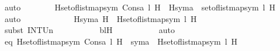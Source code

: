 \begin{isabellebody}
\ auto\isanewline
\isanewline
\ \ \ \ \ \ \isamarkupfalse%
\ {\isachardoublequoteopen}{\isacharparenleft}{\kern0pt}{\isasymInter}H{\isasymin}set{\isacharunderscore}{\kern0pt}of{\isacharunderscore}{\kern0pt}list{\isacharparenleft}{\kern0pt}map{\isacharparenleft}{\kern0pt}sym{\isacharcomma}{\kern0pt}\ Cons{\isacharparenleft}{\kern0pt}a{\isacharcomma}{\kern0pt}\ l{\isacharparenright}{\kern0pt}{\isacharparenright}{\kern0pt}{\isacharparenright}{\kern0pt}{\isachardot}{\kern0pt}\ H{\isacharparenright}{\kern0pt}\ {\isacharequal}{\kern0pt}\ {\isacharparenleft}{\kern0pt}{\isasymInter}H{\isasymin}{\isacharbraceleft}{\kern0pt}sym{\isacharparenleft}{\kern0pt}a{\isacharparenright}{\kern0pt}{\isacharbraceright}{\kern0pt}\ {\isasymunion}\ set{\isacharunderscore}{\kern0pt}of{\isacharunderscore}{\kern0pt}list{\isacharparenleft}{\kern0pt}map{\isacharparenleft}{\kern0pt}sym{\isacharcomma}{\kern0pt}\ l{\isacharparenright}{\kern0pt}{\isacharparenright}{\kern0pt}{\isachardot}{\kern0pt}\ H{\isacharparenright}{\kern0pt}{\isachardoublequoteclose}\ \isamarkupfalse%
\ auto\ \isanewline
\ \ \ \ \ \ \isamarkupfalse%
\ \isamarkupfalse%
\ {\isachardoublequoteopen}{\isachardot}{\kern0pt}{\isachardot}{\kern0pt}{\isachardot}{\kern0pt}\ {\isacharequal}{\kern0pt}\ {\isacharparenleft}{\kern0pt}{\isasymInter}H{\isasymin}{\isacharbraceleft}{\kern0pt}sym{\isacharparenleft}{\kern0pt}a{\isacharparenright}{\kern0pt}{\isacharbraceright}{\kern0pt}{\isachardot}{\kern0pt}\ H{\isacharparenright}{\kern0pt}\ {\isasyminter}\ {\isacharparenleft}{\kern0pt}{\isasymInter}H{\isasymin}set{\isacharunderscore}{\kern0pt}of{\isacharunderscore}{\kern0pt}list{\isacharparenleft}{\kern0pt}map{\isacharparenleft}{\kern0pt}sym{\isacharcomma}{\kern0pt}\ l{\isacharparenright}{\kern0pt}{\isacharparenright}{\kern0pt}{\isachardot}{\kern0pt}\ H{\isacharparenright}{\kern0pt}{\isachardoublequoteclose}\ \isanewline
\ \ \ \ \ \ \ \ \isamarkupfalse%
\ {\isacharparenleft}{\kern0pt}subst\ INT{\isacharunderscore}{\kern0pt}Un{\isacharparenright}{\kern0pt}\ \isanewline
\ \ \ \ \ \ \ \ \isamarkupfalse%
\ bl{\isacharprime}{\kern0pt}H\ \isanewline
\ \ \ \ \ \ \ \ \isamarkupfalse%
\ auto\isanewline
\ \ \ \ \ \ \isamarkupfalse%
\ \isamarkupfalse%
\ eq{\isacharcolon}{\kern0pt}\ {\isachardoublequoteopen}{\isacharparenleft}{\kern0pt}{\isasymInter}H{\isasymin}set{\isacharunderscore}{\kern0pt}of{\isacharunderscore}{\kern0pt}list{\isacharparenleft}{\kern0pt}map{\isacharparenleft}{\kern0pt}sym{\isacharcomma}{\kern0pt}\ Cons{\isacharparenleft}{\kern0pt}a{\isacharcomma}{\kern0pt}\ l{\isacharparenright}{\kern0pt}{\isacharparenright}{\kern0pt}{\isacharparenright}{\kern0pt}{\isachardot}{\kern0pt}\ H{\isacharparenright}{\kern0pt}\ {\isacharequal}{\kern0pt}\ sym{\isacharparenleft}{\kern0pt}a{\isacharparenright}{\kern0pt}\ {\isasyminter}\ {\isacharparenleft}{\kern0pt}{\isasymInter}H{\isasymin}set{\isacharunderscore}{\kern0pt}of{\isacharunderscore}{\kern0pt}list{\isacharparenleft}{\kern0pt}map{\isacharparenleft}{\kern0pt}sym{\isacharcomma}{\kern0pt}\ l{\isacharparenright}{\kern0pt}{\isacharparenright}{\kern0pt}{\isachardot}{\kern0pt}\ H{\isacharparenright}{\kern0pt}{\isachardoublequoteclose}\ \isamarkupfalse%

\end{isabellebody}
